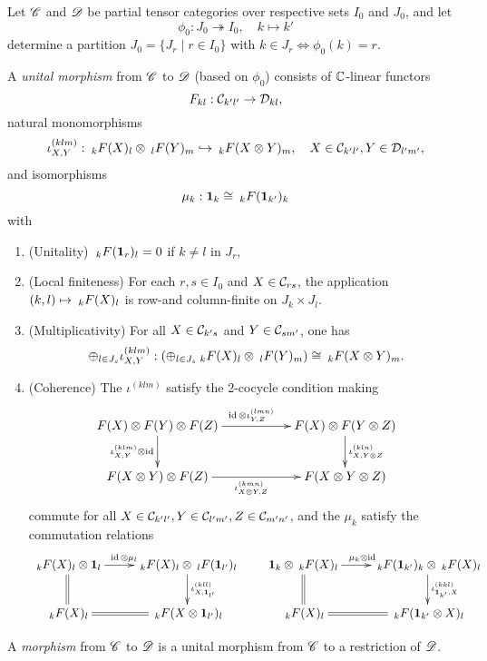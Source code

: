 \begin{Def} Let $\CatCC$ and $\CatDD$ be partial tensor categories over respective sets $I_0$ and $J_0$, and let \[\phi_0:J_0\twoheadrightarrow I_0,\quad k\mapsto k'\] determine a partition $J_0 = \{J_r\mid r\in I_0\}$ with $k\in J_r \iff \phi_0(k)=r$. 

A \emph{unital morphism} from $\CatCC$ to $\CatDD$ (based on $\phi_0$) consists of $\C$-linear functors \[F_{kl}: \CatC_{k'l'}\rightarrow \CatD_{kl},\] natural monomorphisms \[\iota^{(klm)}_{X,Y}: \GrDA{F(X)}{k}{l} \otimes \GrDA{F(Y)}{l}{m} \hookrightarrow \GrDA{F(X\otimes Y)}{k}{m}, \quad X\in \CatC_{k'l'},Y\in \CatD_{l'm'},\] and isomorphisms \[\mu_{k}:  \Unit_k \cong \GrDA{F(\Unit_{k'})}{k}{k}\] with \begin{enumerate}[label=(\alph*)]
\item (Unitality)  $\GrDA{F(\Unit_{r})}{k}{l}= 0$ if $k\neq l$ in $J_r$,
\item (Local finiteness) For each $r,s\in I_0$ and $X\in \CatC_{rs}$, the application $(k,l)\mapsto \GrDA{F(X)}{k}{l}$ is row-and column-finite on $J_k\times J_l$. 
\item (Multiplicativity) For all $X\in \CatC_{k's}$ and $Y\in \CatC_{sm'}$, one has\[\oplus_{l\in J_s} \iota^{(klm)}_{X,Y}: \left(\oplus_{l\in J_s} \GrDA{F(X)}{k}{l} \otimes \GrDA{F(Y)}{l}{m}\right) \cong \GrDA{F(X\otimes Y)}{k}{m}.\]
\item (Coherence) %
The $\iota^{(klm)}$ satisfy the 2-cocycle condition making \[\xymatrix{F(X)\otimes F(Y)\otimes F(Z) \ar[rr]^{\id\otimes \iota^{(lmn)}_{Y,Z}} \ar[d]_{\iota^{(klm)}_{X,Y}\otimes\id}&& F(X)\otimes F(Y\otimes Z)\ar[d]^{\iota^{(kln)}_{X,Y\otimes Z}}\\ F(X\otimes Y)\otimes F(Z) \ar[rr]_{\iota^{(kmn)}_{X\otimes Y,Z}}&& F(X\otimes Y \otimes Z)}\] commute for all $X\in \CatC_{k'l'},Y\in \CatC_{l'm'}, Z\in \CatC_{m'n'}$, and the $\mu_k$ satisfy the commutation relations \[\xymatrix{ \GrDA{F(X)}{k}{l}\otimes \Unit_l \ar[r]^{\!\!\!\!\id\otimes \mu_l} \ar@{=}[d] & \GrDA{F(X)}{k}{l} \otimes \GrDA{F(\Unit_{l'})}{l}{l} \ar[d]^{\iota^{(kll)}_{X, \Unit_{l'}}} \\ \GrDA{F(X)}{k}{l} & \ar@{=}[l] \GrDA{F(X\otimes \Unit_{l'})}{k}{l}} \qquad \xymatrix{  \Unit_k\otimes \GrDA{F(X)}{k}{l}\ar[r]^{\!\!\!\!\mu_k\otimes \id} \ar@{=}[d] & \GrDA{F(\Unit_{k'})}{k}{k} \otimes \GrDA{F(X)}{k}{l} \ar[d]^{\iota^{(kkl)}_{\Unit_{k'},X}} \\ \GrDA{F(X)}{k}{l} & \ar@{=}[l] \GrDA{ F(\Unit_{k'}\otimes X)}{k}{l}} \]
\end{enumerate}

A \emph{morphism} from $\CatCC$ to $\CatDD$ is a unital morphism from $\CatCC$ to a restriction of $\CatDD$. 
\end{Def}

